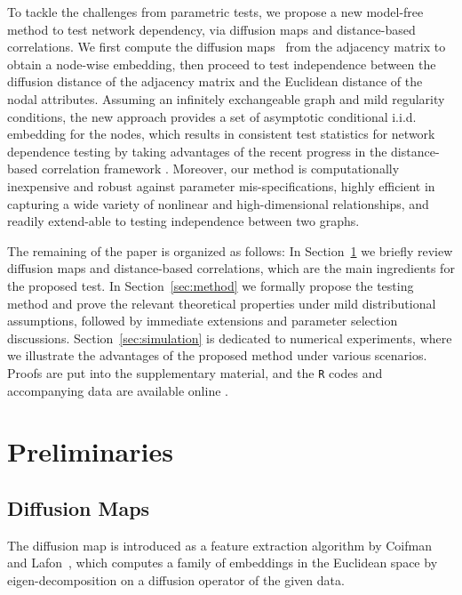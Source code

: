 \documentclass[12pt]{article}
\theoremstyle{definition}
\begin{document}
	To tackle the challenges from parametric tests, we propose a new model-free method to test network dependency, via diffusion maps and distance-based correlations. We first compute the diffusion maps~\citep{coifman2005geometric,coifman2006diffusion,lafon2006diffusion} from the adjacency matrix to obtain a node-wise embedding, then proceed to test independence between the diffusion distance of the adjacency matrix and the Euclidean distance of the nodal attributes. Assuming an infinitely exchangeable graph and mild regularity conditions, the new approach provides a set of asymptotic conditional i.i.d. embedding for the nodes, which results in consistent test statistics for network dependence testing by taking advantages of the recent progress in the distance-based correlation framework \citep{szekely2007measuring,szekelyRizzo2013a, shen2016discovering}. Moreover, our method is computationally inexpensive and robust against parameter mis-specifications, highly efficient in capturing a wide variety of nonlinear and high-dimensional relationships, and readily extend-able to testing independence between two graphs. 
	
	The remaining of the paper is organized as follows: In Section~\ref{sec:pre} we briefly review diffusion maps and distance-based correlations, which are the main ingredients for the proposed test. In Section~\ref{sec:method} we formally propose the testing method and prove the relevant theoretical properties under mild distributional assumptions, followed by immediate extensions and parameter selection discussions. Section~\ref{sec:simulation} is dedicated to numerical experiments, where we illustrate the advantages of the proposed method under various scenarios. Proofs are put into the supplementary material, and the \texttt{R} codes and accompanying data are available online \footnotemark{}.
	
	
	\section{Preliminaries}
	\label{sec:pre}
	\subsection{Diffusion Maps}
	\label{ssec:method2}
	
	The diffusion map is introduced as a feature extraction algorithm by Coifman and Lafon~\citep{coifman2005geometric,coifman2006diffusion,lafon2006diffusion}, which computes a family of embeddings in the Euclidean space by eigen-decomposition on a diffusion operator of the given data. 
	
\end{document}
